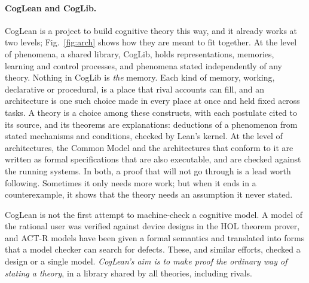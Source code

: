 \documentclass[11pt]{article}
\begin{document}
\paragraph{CogLean and CogLib.}
CogLean\cite{coglean,cogleanintro} is a project to build cognitive
theory this way, and it already works at two levels;
Fig.~\ref{fig:arch} shows how they are meant to fit together. At the level of phenomena, a shared library,
CogLib, holds representations, memories, learning and control
processes, and phenomena stated independently of any theory. Nothing
in CogLib is \emph{the} memory. Each kind of memory, working,
declarative or procedural, is a place that rival accounts can fill, and
an architecture is one such choice made in every place at once and held
fixed across tasks. A theory
is a choice among these constructs, with each postulate cited to its
source, and its theorems are explanations: deductions of a phenomenon
from stated mechanisms and conditions, checked by Lean's kernel. At the
level of architectures, the Common Model and the architectures that
conform to it are written as formal specifications that are also
executable, and are checked against the running systems. In both, a
proof that will not go through is a lead worth following. Sometimes it
only needs more work; but when it ends in a counterexample, it shows
that the theory needs an assumption it never stated.

CogLean is not the first attempt to machine-check a cognitive model. 
A model of the rational user was verified against device
designs in the HOL theorem prover\cite{curzon2001}, and ACT-R models
have been given a formal semantics and translated into forms that a
model checker can search for defects\cite{gall2014,langenfeld2019}. 
These, and similar efforts, checked a design or a single model. 
\emph{CogLean's aim is to make proof the ordinary way of stating a theory}, 
in a library shared by all theories, including rivals.
\end{document}
